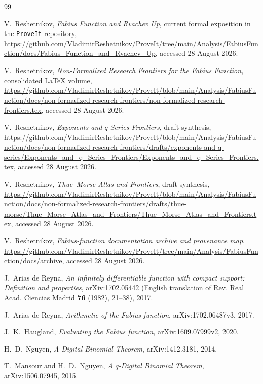 \documentclass[11pt,oneside]{article}
\theoremstyle{definition}
\theoremstyle{remark}
\begin{document}
\begin{thebibliography}{99}

V.~Reshetnikov,
\emph{Fabius Function and Rvachev Up}, current formal exposition in the
\texttt{ProveIt} repository,
\url{https://github.com/VladimirReshetnikov/ProveIt/tree/main/Analysis/FabiusFunction/docs/Fabius_Function_and_Rvachev_Up},
accessed 28 August 2026.

V.~Reshetnikov,
\emph{Non-Formalized Research Frontiers for the Fabius Function}, consolidated
LaTeX volume,
\url{https://github.com/VladimirReshetnikov/ProveIt/blob/main/Analysis/FabiusFunction/docs/non-formalized-research-frontiers/non-formalized-research-frontiers.tex},
accessed 28 August 2026.

V.~Reshetnikov,
\emph{Exponents and \(q\)-Series Frontiers}, draft synthesis,
\url{https://github.com/VladimirReshetnikov/ProveIt/blob/main/Analysis/FabiusFunction/docs/non-formalized-research-frontiers/drafts/exponents-and-q-series/Exponents_and_q_Series_Frontiers/Exponents_and_q_Series_Frontiers.tex},
accessed 28 August 2026.

V.~Reshetnikov,
\emph{Thue--Morse Atlas and Frontiers}, draft synthesis,
\url{https://github.com/VladimirReshetnikov/ProveIt/blob/main/Analysis/FabiusFunction/docs/non-formalized-research-frontiers/drafts/thue-morse/Thue_Morse_Atlas_and_Frontiers/Thue_Morse_Atlas_and_Frontiers.tex},
accessed 28 August 2026.

V.~Reshetnikov,
\emph{Fabius-function documentation archive and provenance map},
\url{https://github.com/VladimirReshetnikov/ProveIt/tree/main/Analysis/FabiusFunction/docs/archive},
accessed 28 August 2026.

J.~Arias de Reyna,
\emph{An infinitely differentiable function with compact support: Definition
and properties}, arXiv:1702.05442 (English translation of
Rev. Real Acad. Ciencias Madrid \textbf{76} (1982), 21--38), 2017.

J.~Arias de Reyna,
\emph{Arithmetic of the Fabius function}, arXiv:1702.06487v3, 2017.

J.~K.~Haugland,
\emph{Evaluating the Fabius function}, arXiv:1609.07999v2, 2020.

H.~D.~Nguyen,
\emph{A Digital Binomial Theorem}, arXiv:1412.3181, 2014.

T.~Mansour and H.~D.~Nguyen,
\emph{A \(q\)-Digital Binomial Theorem}, arXiv:1506.07945, 2015.


\end{thebibliography}
\end{document}
